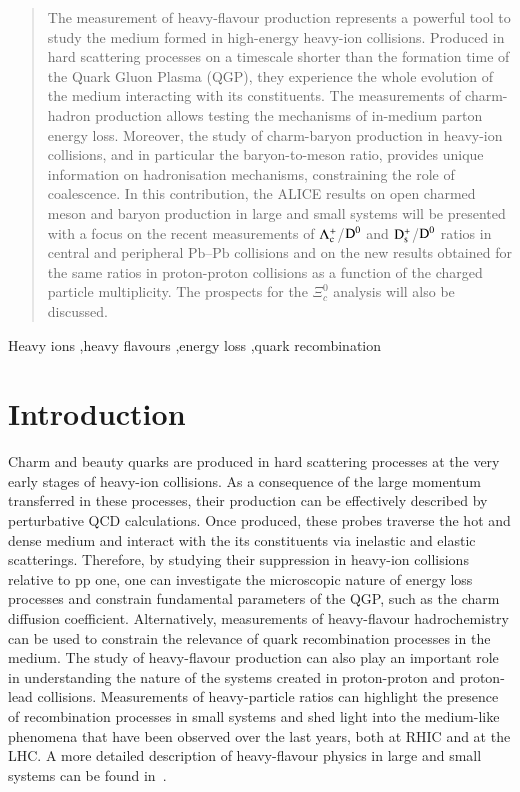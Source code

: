 \documentclass[3p,times,procedia]{elsarticle}
\newcommand{\PbPb}{\mbox{Pb--Pb}}
\newcommand{\Dzero}{{\rm D^0}}
\newcommand{\Ds}{{\rm D_{s}^+}}
\newcommand{\Lc}{{\rm \Lambda_{c}^+}}
\begin{document}
\begin{frontmatter}
\begin{abstract}
The measurement of heavy-flavour production represents a powerful tool to study the medium formed in high-energy 
heavy-ion collisions. Produced in hard scattering processes on a timescale shorter than the formation time of the Quark
Gluon Plasma (QGP), they experience the whole evolution of the medium interacting with its constituents. The measurements of charm-hadron 
production allows testing the mechanisms of in-medium parton energy loss. Moreover, the study of charm-baryon 
production in heavy-ion collisions, and in particular the baryon-to-meson ratio, provides unique information on 
hadronisation mechanisms, constraining the role of coalescence.
In this contribution, the ALICE results on open charmed meson and baryon production in large and small systems will be presented
with a focus on the recent measurements of $\Lc$/$\Dzero$ and $\Ds$/$\Dzero$ ratios in central and peripheral $\PbPb$ collisions 
and on the new results obtained for the same ratios in proton-proton collisions as a function of the charged particle multiplicity.
The prospects for the $\Xi^{0}_{c}$ analysis will also be discussed.
\end{abstract}

\begin{keyword}
Heavy ions \sep heavy flavours \sep energy loss \sep quark recombination
\end{keyword}
\end{frontmatter}


\section{Introduction}
\label{intro}
Charm and beauty quarks are produced in hard scattering processes at the very early stages of heavy-ion collisions. As a consequence of the 
large momentum transferred in these processes, their production can be effectively described by perturbative QCD calculations. 
Once produced, these probes traverse the hot and dense medium and interact with the its constituents via inelastic and elastic scatterings.
Therefore, by studying their suppression in heavy-ion collisions relative to pp one, one can investigate the microscopic nature of energy loss processes
and constrain fundamental parameters of the QGP, such as the charm diffusion coefficient. Alternatively, measurements of 
heavy-flavour hadrochemistry can be used to constrain the relevance of quark recombination processes in the medium.
The study of heavy-flavour production can also play an important role in understanding the nature of the systems created in proton-proton and 
proton-lead collisions. Measurements of heavy-particle ratios can highlight the presence of recombination 
processes in small systems and shed light into the medium-like phenomena that have been observed over the last years, both at RHIC and at the LHC. 
A more detailed description of heavy-flavour physics in large and small systems can be found in~\cite{saporegravis,prinorapp,yenjie}.
\end{document}
